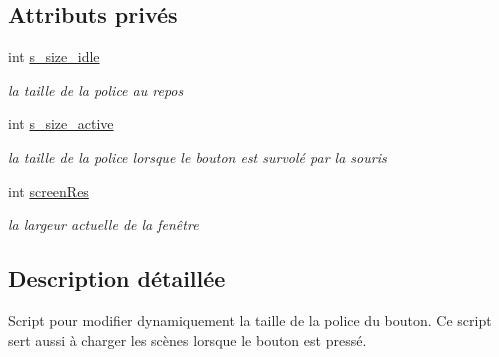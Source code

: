 \subsection*{Attributs privés}
\begin{DoxyCompactItemize}
\item 
\hypertarget{class_adaptive_font_a91f43ecc9ea5d9a007b0fcc6362f72e5}{int \hyperlink{class_adaptive_font_a91f43ecc9ea5d9a007b0fcc6362f72e5}{s\+\_\+size\+\_\+idle}}\label{class_adaptive_font_a91f43ecc9ea5d9a007b0fcc6362f72e5}

\begin{DoxyCompactList}\small\item\em la taille de la police au repos \end{DoxyCompactList}\item 
\hypertarget{class_adaptive_font_a444603ec6b952627fef7ab28ec2f5990}{int \hyperlink{class_adaptive_font_a444603ec6b952627fef7ab28ec2f5990}{s\+\_\+size\+\_\+active}}\label{class_adaptive_font_a444603ec6b952627fef7ab28ec2f5990}

\begin{DoxyCompactList}\small\item\em la taille de la police lorsque le bouton est survolé par la souris \end{DoxyCompactList}\item 
\hypertarget{class_adaptive_font_aa6ffb114d920e9cb8b3b5da59ec067d2}{int \hyperlink{class_adaptive_font_aa6ffb114d920e9cb8b3b5da59ec067d2}{screen\+Res}}\label{class_adaptive_font_aa6ffb114d920e9cb8b3b5da59ec067d2}

\begin{DoxyCompactList}\small\item\em la largeur actuelle de la fenêtre \end{DoxyCompactList}\end{DoxyCompactItemize}


\subsection{Description détaillée}
Script pour modifier dynamiquement la taille de la police du bouton. Ce script sert aussi à charger les scènes lorsque le bouton est pressé. 